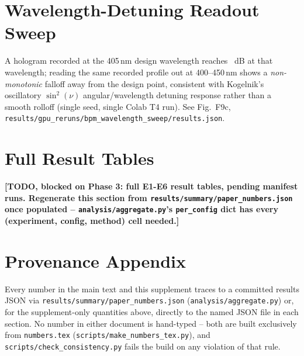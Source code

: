 \documentclass[10pt]{article}
\begin{document}
\section{Wavelength-Detuning Readout Sweep}
A hologram recorded at the 405\,nm design wavelength reaches
\WavelengthDesignPSNR~dB at that wavelength; reading the same recorded
profile out at 400--450\,nm shows a \emph{non-monotonic} falloff away
from the design point, consistent with Kogelnik's oscillatory
$\sin^2(\nu)$ angular/wavelength detuning response rather than a smooth
rolloff (single seed, single Colab T4 run). See Fig.~F9c,
\texttt{results/gpu\_reruns/bpm\_wavelength\_sweep/results.json}.

\section{Full Result Tables}
\textbf{[TODO, blocked on Phase 3: full E1-E6 result tables, pending
manifest runs. Regenerate this section from
\texttt{results/summary/paper\_numbers.json} once populated --
\texttt{analysis/aggregate.py}'s \texttt{per\_config} dict has every
(experiment, config, method) cell needed.]}

\section{Provenance Appendix}
Every number in the main text and this supplement traces to a committed
results JSON via \texttt{results/summary/paper\_numbers.json}
(\texttt{analysis/aggregate.py}) or, for the supplement-only quantities
above, directly to the named JSON file in each section. No number in
either document is hand-typed -- both are built exclusively from
\texttt{numbers.tex} (\texttt{scripts/make\_numbers\_tex.py}), and
\texttt{scripts/check\_consistency.py} fails the build on any violation
of that rule.
\end{document}
